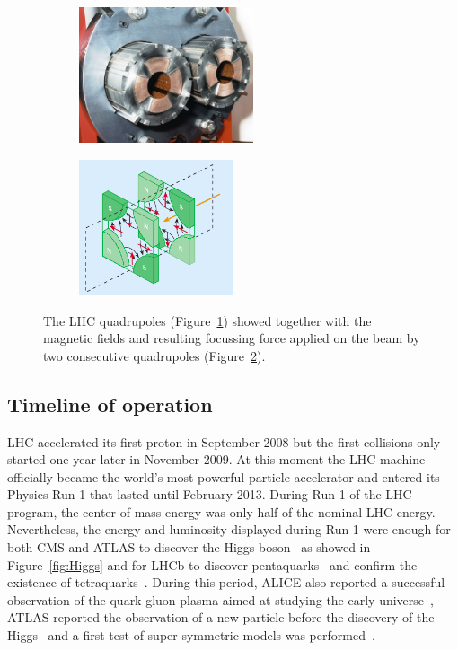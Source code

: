 \endgroup
	
	\begin{figure}[H]
		\begin{subfigure}{0.5\linewidth}
			\centering
			\includegraphics[height = 4cm]{fig/chapt2/LHC-quadrupole.jpg}
			\caption{\label{fig:LHCQuadrupole:A}}
		\end{subfigure}
		\begin{subfigure}{0.5\linewidth}
			\centering
			\includegraphics[height = 4cm]{fig/chapt2/LHC-quadrupole-field.png}
			\caption{\label{fig:LHCQuadrupole:B}}
		\end{subfigure}
		\caption{\label{fig:LHCQuadrupole} The LHC quadrupoles (Figure~\ref{fig:LHCQuadrupole:A}) showed together with the magnetic fields and resulting focussing force applied on the beam by two consecutive quadrupoles (Figure~\ref{fig:LHCQuadrupole:B}).}
	\end{figure}
	
	\subsection{Timeline of operation}
	\label{chapt2:ssec:timeline}
	
	LHC accelerated its first proton in September 2008 but the first collisions only started one year later in November 2009. At this moment the LHC machine officially became the world's most powerful particle accelerator and entered its Physics Run 1 that lasted until February 2013. During Run 1 of the LHC program, the center-of-mass energy was only half of the nominal LHC energy. Nevertheless, the energy and luminosity displayed during Run 1 were enough for both CMS and ATLAS to discover the Higgs boson~\cite{ATLAS2012,CMS2012} as showed in Figure~\ref{fig:Higgs} and for LHCb to discover pentaquarks~\cite{PENTAQUARK2015} and confirm the existence of tetraquarks~\cite{TETRAQUARK2017}. During this period, ALICE also reported a successful observation of the quark-gluon plasma aimed at studying the early universe~\cite{ALICEINFO}, ATLAS reported the observation of a new particle before the discovery of the Higgs~\cite{CHIB2012} and a first test of super-symmetric models was performed~\cite{B0SDECAY2013}.
	
